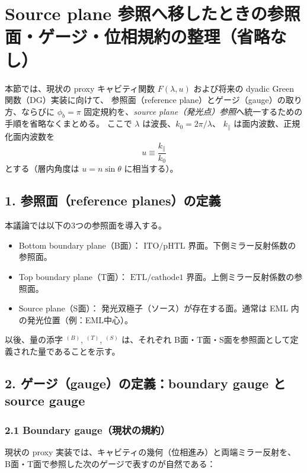 
\section*{Source plane 参照へ移したときの参照面・ゲージ・位相規約の整理（省略なし）}

本節では、現状の proxy キャビティ関数 \(F(\lambda,u)\) および将来の dyadic Green 関数（DG）実装に向けて、
参照面（reference plane）とゲージ（gauge）の取り方、ならびに
\(\phi_b=\pi\) 固定規約を、\emph{source plane（発光点）参照}へ統一するための手順を省略なくまとめる。
ここで \(\lambda\) は波長、\(k_0=2\pi/\lambda\)、
\(k_\parallel\) は面内波数、正規化面内波数を
\begin{equation}
u \equiv \frac{k_\parallel}{k_0}
\end{equation}
とする（層内角度は \(u=n\sin\theta\) に相当する）。

\subsection*{1. 参照面（reference planes）の定義}

本議論では以下の3つの参照面を導入する。

\begin{itemize}
\item Bottom boundary plane（B面）：
\(\mathrm{ITO/pHTL}\) 界面。下側ミラー反射係数の参照面。
\item Top boundary plane（T面）：
\(\mathrm{ETL/cathode1}\) 界面。上側ミラー反射係数の参照面。
\item Source plane（S面）：
発光双極子（ソース）が存在する面。通常は EML 内の発光位置（例：EML中心）。
\end{itemize}

以後、量の添字 \(^{(B)}\), \(^{(T)}\), \(^{(S)}\) は、それぞれ B面・T面・S面を参照面として定義された量であることを示す。

\subsection*{2. ゲージ（gauge）の定義：boundary gauge と source gauge}

\subsubsection*{2.1 Boundary gauge（現状の規約）}

現状の proxy 実装では、キャビティの幾何（位相進み）と両端ミラー反射を、
B面・T面で参照した次のゲージで表すのが自然である：

